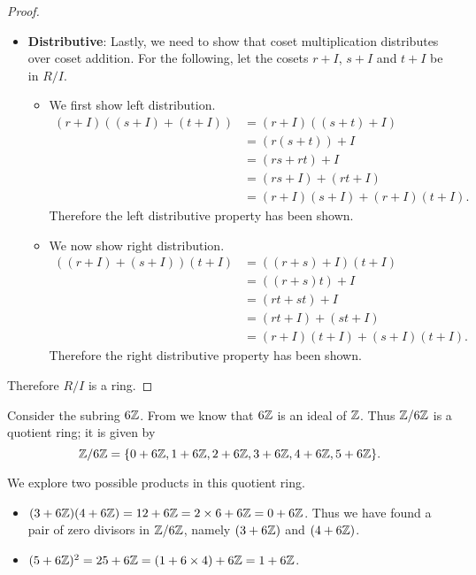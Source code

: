 \begin{proof}
\begin{itemize}
\begin{itemize}
        \end{itemize}
        \item \textbf{Distributive}: Lastly, we need to show that coset multiplication distributes over coset addition. For the following, let the cosets $r+I$, $s+I$ and $t+I$ be in $R/I$.
        \begin{itemize}
            \item We first show left distribution.
            \begin{align*}
                (r+I)((s+I)+(t+I)) &= (r+I)((s+t)+I)\\
                &= (r(s+t))+I\\
                &= (rs+rt)+I\\
                &= (rs+I) + (rt+I)\\
                &=(r+I)(s+I) + (r+I)(t+I).
            \end{align*}
            Therefore the left distributive property has been shown.

            \item We now show right distribution.
            \begin{align*}
                ((r+I)+(s+I))(t+I) &= ((r+s)+I)(t+I)\\
                &= ((r+s)t)+I\\
                &= (rt+st)+I\\
                &= (rt+I) + (st+I)\\
                &= (r+I)(t+I) + (s+I)(t+I).
            \end{align*}
            Therefore the right distributive property has been shown.
        \end{itemize}
    \end{itemize}
    Therefore $R/I$ is a ring.
\end{proof}

\begin{example}
    Consider the subring $6\mathbb{Z}$. From  we know that $6\mathbb{Z}$ is an ideal of $\mathbb{Z}$. Thus $\mathbb{Z}/6\mathbb{Z}$ is a quotient ring; it is given by
    \[
        \mathbb{Z}/6\mathbb{Z} = \{0 + 6\mathbb{Z}, 1+6\mathbb{Z}, 2+6\mathbb{Z}, 3+6\mathbb{Z}, 4+6\mathbb{Z}, 5+6\mathbb{Z}\}.
    \]
    
    We explore two possible products in this quotient ring.
    \begin{itemize}
        \item $(3+6\mathbb{Z})(4+6\mathbb{Z}) = 12+6\mathbb{Z} = 2\times 6 + 6\mathbb{Z} = 0 + 6\mathbb{Z}$. Thus we have found a pair of zero divisors in $\mathbb{Z}/6\mathbb{Z}$, namely $(3+6\mathbb{Z})$ and $(4+6\mathbb{Z})$.
        \item $(5+6\mathbb{Z})^2 = 25+6\mathbb{Z} = (1 + 6\times4) + 6\mathbb{Z} = 1 + 6\mathbb{Z}$.
    \end{itemize}
\end{example}

